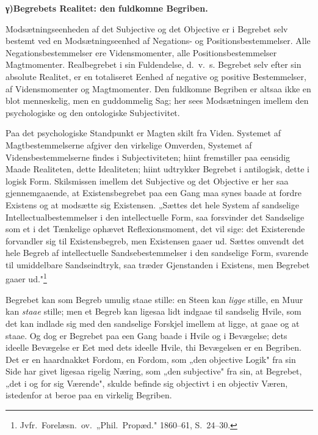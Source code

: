 \documentclass[12pt]{book}
\newcommand{\opage}[1]{\marginnote{\footnotesize\textit{[#1]}}}
\begin{document}
\begin{center}{\bfseries γ)\quad Begrebets Realitet: den fuldkomne Begriben.}\end{center}

Modsætningseenheden af det Subjective og det Objective er i Begrebet selv bestemt ved en
Modsætningseenhed af Negations- og Positionsbestemmelser. Alle Negationsbestemmelser ere
Vidensmomenter, alle Positionsbestemmelser Magtmomenter. Realbegrebet i sin Fuldendelse, d.\ v.\
s. Begrebet selv efter sin absolute Realitet, er en totaliseret Eenhed af negative og positive
Bestemmelser, af Vidensmomenter og Magtmomenter. Den fuldkomne Begriben er altsaa ikke en blot
menneskelig, men en guddommelig Sag; her sees Modsætningen imellem den psychologiske og den
ontologiske Subjectivitet.

Paa det psychologiske Standpunkt er Magten skilt fra Viden. Systemet af Magtbestemmelserne
afgiver den virkelige
\opage{167} Omverden, Systemet af Vidensbestemmelserne findes i Subjectiviteten; hiint fremstiller paa
eensidig Maade Realiteten, dette Idealiteten; hiint udtrykker Begrebet i antilogisk, dette i
logisk Form. Skilsmissen imellem det Subjective og det Objective er her saa gjennemgaaende, at
Existensbegrebet paa een Gang maa synes baade at fordre Existens og at modsætte sig Existensen.
„Sættes det hele System af sandselige Intellectualbestemmelser i den intellectuelle Form, saa
forsvinder det Sandselige som et i det Tænkelige ophævet Reflexionsmoment, det vil sige: det
Existerende forvandler sig til Existensbegreb, men Existensen gaaer ud. Sættes omvendt det hele
Begreb af intellectuelle Sandsebestemmelser i den sandselige Form, svarende til umiddelbare
Sandseindtryk, saa træder Gjenstanden i Existens, men Begrebet gaaer ud."\footnote{Jvfr.\
Forelæsn.\ ov.\ „Phil.\ Propæd." 1860--61, S.~24--30.}

Begrebet kan som Begreb umulig staae stille: en Steen kan \emph{ligge} stille, en Muur kan
\emph{staae} stille; men et Begreb kan ligesaa lidt indgaae til sandselig Hvile, som det kan
indlade sig med den sandselige Forskjel imellem at ligge, at gaae og at staae. Og dog er
Begrebet paa een Gang baade i Hvile og i Bevægelse; dets ideelle Bevægelse er Eet med dets
ideelle Hvile, thi Bevægelsen er en Begriben. Det er en haardnakket Fordom, en Fordom, som „den
objective Logik" fra sin Side har givet ligesaa rigelig Næring, som „den subjective" fra sin, at
Begrebet, „det i og for sig Værende", skulde befinde sig objectivt i en objectiv Væren,
istedenfor at beroe paa en virkelig Begriben.
\end{document}

